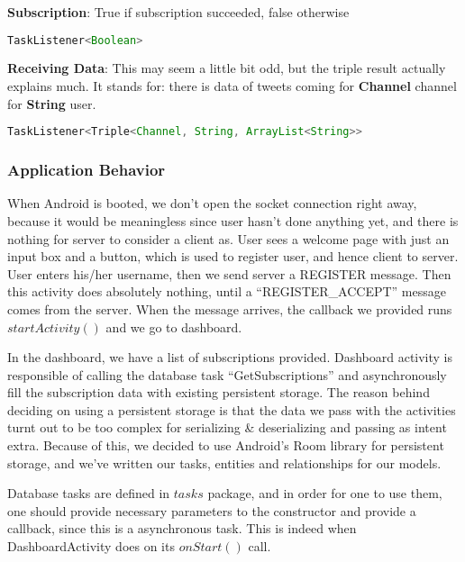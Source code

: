 \documentclass{article}
\begin{document}
\par \textbf{Subscription}: True if subscription succeeded, false otherwise
\begin{lstlisting}[firstline=1, language=Java]
TaskListener<Boolean>
\end{lstlisting}

\par \textbf{Receiving Data}: This may seem a little bit odd, but the triple result actually explains much. It stands for: there is data of tweets coming for \textbf{Channel} channel for \textbf{String} user.
\begin{lstlisting}[firstline=1, language=Java]
TaskListener<Triple<Channel, String, ArrayList<String>>
\end{lstlisting}

\newpage

\subsubsection{Application Behavior}
\label{application_behavior}
\par When Android is booted, we don't open the socket connection right away, because it would be meaningless since user hasn't done anything yet, and there is nothing for server to consider a client as. User sees a welcome page with just an input box and a button, which is used to register user, and hence client to server. User enters his/her username, then we send server a REGISTER message. Then this activity does absolutely nothing, until a ``REGISTER\_ACCEPT'' message comes from the server. When the message arrives, the callback we provided runs $startActivity()$ and we go to dashboard.

\par In the dashboard, we have a list of subscriptions provided. Dashboard activity is responsible of calling the database task ``GetSubscriptions'' and asynchronously fill the subscription data with existing persistent storage. The reason behind deciding on using a persistent storage is that the data we pass with the activities turnt out to be too complex for serializing \& deserializing and passing as intent extra. Because of this, we decided to use Android's Room library for persistent storage, and we've written our tasks, entities and relationships for our models.

\par Database tasks are defined in $tasks$ package, and in order for one to use them, one should provide necessary parameters to the constructor and provide a callback, since this is a asynchronous task. This is indeed when DashboardActivity does on its $onStart()$ call.
\end{document}
